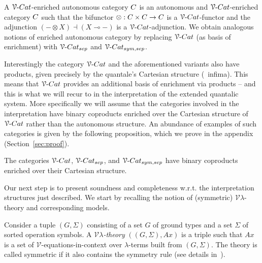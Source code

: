\documentclass[a4paper,UKenglish,cleveref, autoref, thm-restate]{lipics-v2021}
\begin{document}
\begin{definition}\label{defn:enr_aut}
  A $\VCat$-enriched autonomous category $\catC$ is an autonomous and
  $\VCat$-enriched category $\catC$ such that the bifunctor $\otimes : \catC
  \times \catC \to \catC$ is a $\VCat$-functor and the adjunction $(- \otimes
  X) \dashv (X \multimap -)$ is a $\VCat$-adjunction.  We obtain analogous
  notions of enriched autonomous category by replacing $\VCat$ (as basis of
  enrichment) with $\VCatSe$ and $\VCatSS$.
\end{definition}
Interestingly the category $\VCat$ and the aforementioned variants also have
products, given precisely by the quantale's Cartesian structure (\ie\ infima).
This means that $\VCat$ provides an additional basis of enrichment via products
-- and this is what we will recur to in the interpretation of the extended
quantalic system. More specifically we will assume that the categories involved
in the interpretation have binary coproducts enriched over the Cartesian
structure of $\VCat$ rather than the autonomous structure. An abundance of
examples of such categories is given by the following proposition, which we
prove in the appendix (Section~\ref{sec:proof}).

\begin{proposition}
        \label{prop:vcat}
        The categories $\VCat$, $\VCatSe$, and $\VCatSS$   have binary
        coproducts enriched over their Cartesian structure.
\end{proposition}
Our next step is to present soundness and completeness w.r.t.  the
interpretation structures just described. We start by recalling the notion of
(symmetric) $\mathcal{V}\lambda$-theory and corresponding models.

\begin{definition}\label{defn:theory}
  Consider a tuple $(G,\Sigma)$ consisting of a set $G$ of ground types and a
  set $\Sigma$ of sorted operation symbols.  A \emph{$\mathcal{V}
  \lambda$-theory} $((G,\Sigma),Ax)$ is a triple such that $Ax$ is a set of
  $\mathcal{V}$-equations-in-context over $\lambda$-terms built from
  $(G,\Sigma)$. The theory is called symmetric if it also contains the symmetry
  rule (see details in~\cite{dahlqvist22,dahlqvist2023syntactic}).
\end{definition}
\end{document}
